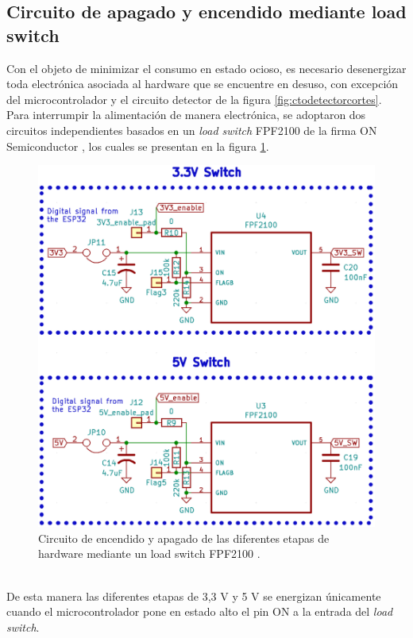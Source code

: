  \subsection{Circuito de apagado y encendido mediante load switch}
 Con el objeto de minimizar el consumo en estado ocioso, es necesario desenergizar toda electrónica asociada al hardware que se encuentre en desuso, con excepción del microcontrolador y el circuito detector de la figura \ref{fig:ctodetectorcortes}.\\
 Para interrumpir la alimentación de manera electrónica, se adoptaron dos circuitos independientes basados en un \textit{load switch} FPF2100 de la firma ON Semiconductor \citep{fpf2100}, los cuales se presentan en la figura \ref{fig:ctoloadswitch}.
 \begin{figure}[h]
 	\centering
 	\includegraphics[width=0.8\linewidth]{Figures/cto_load_switch}
 	\caption{Circuito de encendido y apagado de las diferentes etapas de hardware mediante un load switch FPF2100 \citep{fpf2100}.}
 	\label{fig:ctoloadswitch}
 \end{figure}\\
De esta manera las diferentes etapas de 3,3 V y 5 V se energizan únicamente cuando el microcontrolador pone en estado alto el pin ON a la entrada del \textit{load switch}.\\
 
